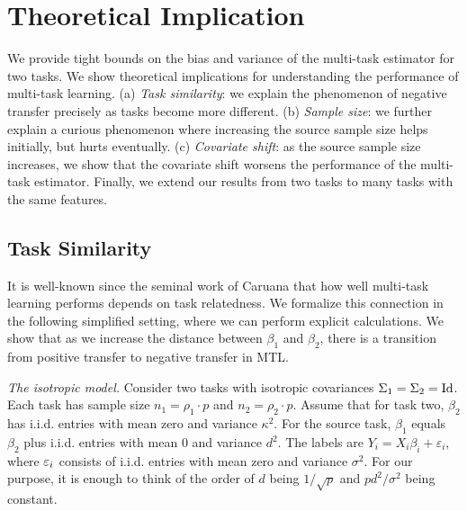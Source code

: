 \section{Theoretical Implication}\label{sec_insight}

We provide tight bounds on the bias and variance of the multi-task estimator for two tasks.
We show theoretical implications for understanding the performance of multi-task learning.
(a) \textit{Task similarity}: we explain the phenomenon of negative transfer precisely as tasks become more different.
(b) \textit{Sample size}: we further explain a curious phenomenon where increasing the source sample size helps initially, but hurts eventually.
(c) \textit{Covariate shift}: as the source sample size increases, we show that the covariate shift worsens the performance of the multi-task estimator.
Finally, we extend our results from two tasks to many tasks with the same features.




\subsection{Task Similarity}\label{sec_similarity}

It is well-known since the seminal work of Caruana \cite{C97} that how well multi-task learning performs depends on task relatedness.
We formalize this connection in the following simplified setting, where we can perform explicit calculations.
We show that as we increase the distance between $\beta_1$ and $\beta_2$, there is a transition from positive transfer to negative transfer in MTL.

\textit{The isotropic model.}
	Consider two tasks with isotropic covariances $\Sigma_1 = \Sigma_2 = \operatorname{Id}$.
	Each task has sample size $n_1 = \rho_1 \cdot p$ and $n_2 = \rho_2 \cdot p$.
	Assume that for  task two, $\beta_2$ has i.i.d. entries with mean zero and variance $\kappa^2$.
	For the source task, $\beta_1 $ equals $\beta_2$ plus i.i.d. entries with mean $0$ and variance $d^2$.
	The labels are $Y_i = X_i\beta_i + \varepsilon_i$, where ${\varepsilon}_i$ consists of i.i.d. entries with mean zero and variance $\sigma^2$.
	For our purpose, it is enough to think of the order of $d$ being $1/\sqrt{p}$ and $pd^2/\sigma^2$ being constant.

